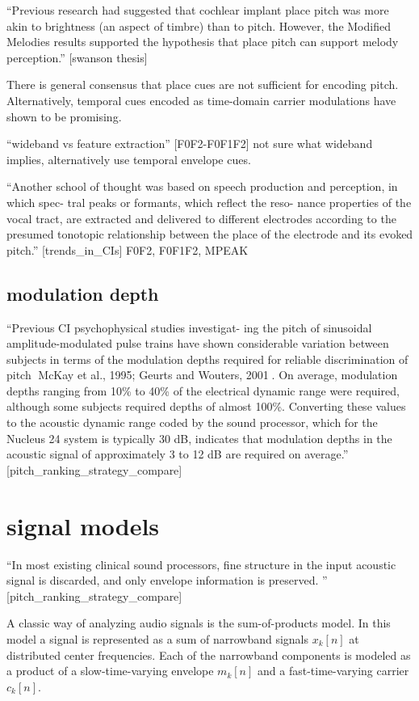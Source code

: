 \documentclass [11pt, proquest] {uwthesis}[2015/03/03]
\begin{document}
``Previous research had suggested that cochlear implant place pitch was more akin to brightness (an aspect of timbre) than to pitch. However, the Modified Melodies results supported the hypothesis that place pitch can support melody perception.'' [swanson thesis]

There is general consensus that place cues are not sufficient for encoding pitch.  Alternatively, temporal cues encoded as time-domain carrier modulations have shown to be promising.


``wideband vs feature extraction'' [F0F2-F0F1F2]
not sure what wideband implies, alternatively use temporal envelope cues.

``Another school of thought was based on speech production and perception, in which spec- tral peaks or formants, which reflect the reso- nance properties of the vocal tract, are extracted and delivered to different electrodes according to the presumed tonotopic relationship between the place of the electrode and its evoked pitch.'' [trends_in_CIs]
F0F2, F0F1F2, MPEAK



\subsection{modulation depth}

``Previous CI psychophysical studies investigat- ing the pitch of sinusoidal amplitude-modulated pulse trains have shown considerable variation between subjects in terms of the modulation depths required for reliable discrimination of pitch 􏰄McKay et al., 1995; Geurts and Wouters, 2001􏰀. On average, modulation depths ranging from 10\% to 40\% of the electrical dynamic range were required, although some subjects required depths of almost 100\%. Converting these values to the acoustic dynamic range coded by the sound processor, which for the Nucleus 24 system is typically 30 dB, indicates that modulation depths in the acoustic signal of approximately 3 to 12 dB are required on average.'' [pitch_ranking_strategy_compare]

\section{signal models}

``In most existing clinical sound processors, fine structure in the input acoustic signal is discarded, and only envelope information is preserved. '' [pitch_ranking_strategy_compare]


A classic way of analyzing audio signals is the sum-of-products model.  In this model a signal is represented as a sum of narrowband signals $x_k[n]$ at distributed center frequencies.  Each of the narrowband components is modeled as a product of a slow-time-varying envelope $m_k[n]$ and a fast-time-varying carrier $c_k[n]$.
\end{document}
